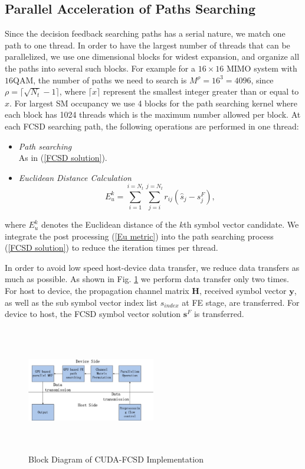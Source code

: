 \documentclass[letterpaper, 10pt, conference, twoside]{ieeeconf}
\begin{document}
\subsection{Parallel Acceleration of Paths Searching}
Since the decision feedback searching paths has a serial nature, we match one path to one thread. In order to have the largest number of threads that can be parallelized, we use one dimensional blocks for widest expansion, and organize all the paths into several such blocks. For example for a $16\times 16$ MIMO system with $16$QAM, the number of paths we need to search is $M^{\rho}=16^{3}=4096$, since $\rho=\lceil \sqrt{N_{t}}-1\rceil$, where $\lceil x\rceil$ represent the smallest integer greater than or equal to $x$. For largest SM occupancy we use 4 blocks for the path searching kernel where each block has 1024 threads which is the maximum number allowed per block. At each FCSD searching path, the following operations are performed in one thread:
\begin{itemize}
\item \emph{Path searching}\\
As in (\ref{FCSD solution}).
\item \emph{Euclidean Distance Calculation}
\begin{equation}
E_{u}^{k}=\sum_{i=1}^{i=N_{t}}\sum_{j=i}^{j=N_{t}}r_{ij}(\hat{s}_{j}-s^{F}_{j}), \label{Eu metric}
\end{equation}
\end{itemize}
where $E_{u}^{k}$ denotes the Euclidean distance of the $k$th symbol vector candidate. We integrate the post processing (\ref{Eu metric}) into the path searching process (\ref{FCSD solution}) to reduce the iteration times per thread.
 
In order to avoid low speed host-device data transfer, we reduce data transfers as much as possible. As shown in Fig. \ref{block diagram} we perform data transfer only two times. For host to device, the propagation channel matrix $\mathbf{H}$, received symbol vector $\mathbf{y}$, as well as the sub symbol vector index list $\mathit{s_{index}}$ at FE stage, are transferred. For device to host, the FCSD symbol vector solution $\mathbf{s}^{F}$ is transferred.
\begin{figure}[htb]
\centering
\includegraphics[width=0.5\textwidth, height=5.5cm]{CUDA_FCSD_block_diagram.eps}
\caption{Block Diagram of CUDA-FCSD Implementation}
\label{block diagram}
\end{figure}
\end{document}

